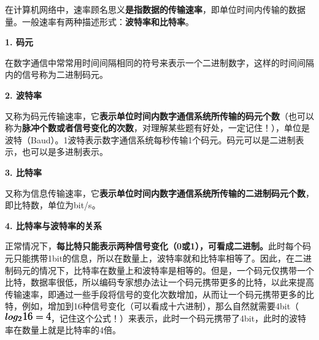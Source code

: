 在计算机网络中，速率顾名思义\textbf{是指数据的传输速率}，即单位时间内传输的数据量。一般速率有两种描述形式：\textbf{波特率和比特率}。

{\textbf{1. 码元}}

在数字通信中常常用时间间隔相同的符号来表示一个二进制数字，这样的时间间隔内的信号称为二进制码元。

\textbf{{2. 波特率}}

又称为码元传输速率，它\textbf{表示单位时间内数字通信系统所传输的码元个数}（也可以称为\textbf{脉冲个数或者信号变化的次数}，对理解某些题有好处，一定记住！），单位是波特（Baud）。1波特表示数字通信系统每秒传输1个码元。码元可以是二进制表示，也可以是多进制表示。

\textbf{{3. 比特率}}

又称为信息传输速率，它\textbf{表示单位时间内数字通信系统所传输的二进制码元个数}，即比特数，单位为bit/s。

\textbf{{4. 比特率与波特率的关系}}

正常情况下，\textbf{每比特只能表示两种信号变化（0或1），可看成二进制。}此时每个码元只能携带1bit的信息，所以在数量上，波特率就和比特率相等了。因此，在二进制码元的情况下，比特率在数量上和波特率是相等的。但是，一个码元仅携带一个比特，数据率很低，所以编码专家想办法让一个码元携带更多的比特，以此来提高传输速率，即通过一些手段将信号的变化次数增加，从而让一个码元携带更多的比特，例如，增加到16种信号变化（可以看成十六进制），那么自然就需要4bit（\includegraphics[width=0.78125in,height=0.15625in]{texmath/badcf0log2164}，记住这个公式！）来表示，此时一个码元携带了4bit，此时的波特率在数量上就是比特率的4倍。\\
